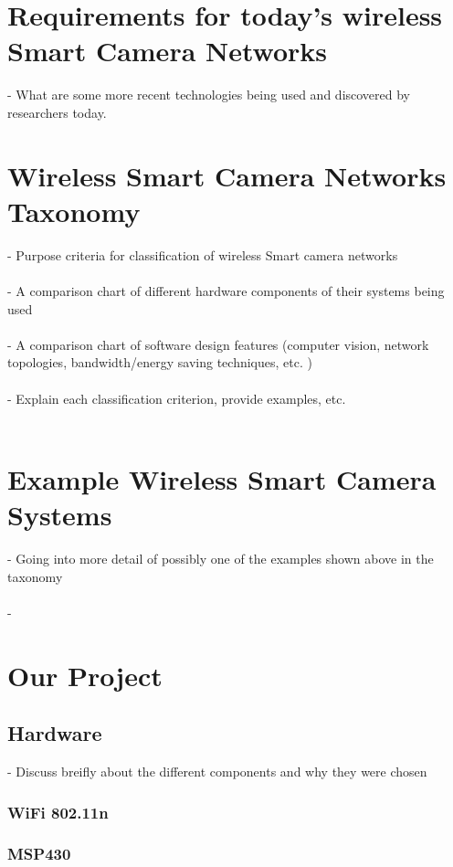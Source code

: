\documentclass[journal,transmag]{IEEEtran}
\begin{document}
\section{Requirements for today's wireless Smart Camera Networks}
\-- What are some more recent technologies being used and discovered by
researchers today. \\

\section{Wireless Smart Camera Networks Taxonomy}
\-- Purpose criteria for classification of wireless Smart camera networks \\ \\
\-- A comparison chart of different hardware components of their systems 
	being used\\ \\
\-- A comparison chart of software design features (computer vision, network
	topologies, bandwidth/energy saving techniques, etc. )\\ \\
\-- Explain each classification criterion, provide examples, etc.\\ \\

\section{Example Wireless Smart Camera Systems}
\-- Going into more detail of possibly one of the examples shown above in
	the taxonomy\\ \\
\--

\section{Our Project}

\subsection{Hardware}
 \-- Discuss breifly about the different components and why they were chosen \\

\subsubsection{WiFi 802.11n \\}
\subsubsection{MSP430 \\}
\end{document}
